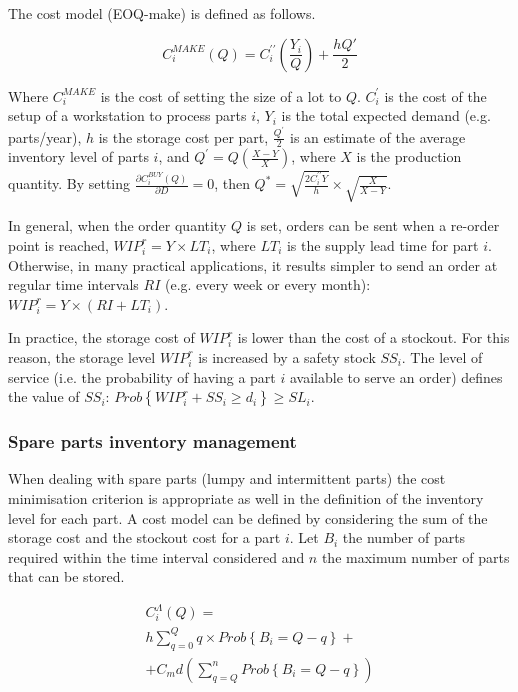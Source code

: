 The cost model (EOQ-make) is defined as follows.

\begin{equation}
    C_i^{MAKE}\left(Q\right)=C_i^{\prime\prime}\left(\frac{Y_i}{Q}\right)+\frac{hQ\prime}{2}
\end{equation}

Where $C_i^{MAKE}$ is the cost of setting the size of a lot to $Q$. $C_i^\prime$ is the cost of the setup of a workstation to process parts $i$, $Y_i$ is the total expected demand (e.g. parts/year), $h$ is the storage cost per part, $\frac{Q^\prime}{2}$ is an estimate of the average inventory level of parts $i$, and $Q^\prime=Q\left(\frac{X-Y}{X}\right)$, where $X$ is the production quantity. By setting $\frac{\partial C_i^{BUY}(Q)}{\partial D}=0$, then $Q^\ast=\sqrt{\frac{2C_i^{\prime\prime}Y}{h}}\times\sqrt{\frac{X}{X-Y}}$.\par

In general, when the order quantity $Q$ is set, orders can be sent when a re-order point is reached, $WIP_i^r=Y\times LT_i$, where $LT_i$ is the supply lead time for part $i$. Otherwise, in many practical applications, it results simpler to send an order at regular time intervals $RI$ (e.g. every week or every month): $WIP_i^r=Y\times(RI+LT_i)$.\par

In practice, the storage cost of $WIP_i^r$ is lower than the cost of a stockout. For this reason, the storage level $WIP_i^r$ is increased by a safety stock $SS_i$. The level of service (i.e. the probability of having a part $i$ available to serve an order) defines the value of $SS_i$: $Prob\left\{WIP_i^r+SS_i\geq d_i\right\}\geq SL_{i}$.

\subsubsection{Spare parts inventory management}
When dealing with spare parts (lumpy and intermittent parts) the cost minimisation criterion is appropriate as well in the definition of the inventory level for each part. A cost model can be defined by considering the sum of the storage cost and the stockout cost for a part $i$. Let $B_i$ the number of parts required within the time interval considered and $n$ the maximum number of parts that can be stored.

\begin{equation}
\begin{split}
    C_i^\Lambda\left(Q\right)=\\
    h \sum_{q=0}^{Q}q \times Prob\left\{B_i=Q-q\right\} +\\
    + C_md \left(\sum_{q=Q}^{n} Prob\left\{B_i=Q-q\right\} \right)\\
\end{split}
\end{equation}

